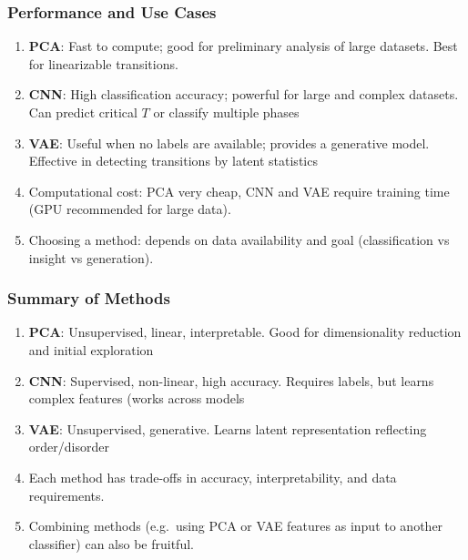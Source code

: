 \documentclass{beamer}
\begin{document}
\begin{frame}
\frametitle{Performance and Use Cases}

\begin{enumerate}
\item \textbf{PCA}: Fast to compute; good for preliminary analysis of large datasets. Best for linearizable transitions.

\item \textbf{CNN}: High classification accuracy; powerful for large and complex datasets. Can predict critical $T$ or classify multiple phases 

\item \textbf{VAE}: Useful when no labels are available; provides a generative model. Effective in detecting transitions by latent statistics 

\item Computational cost: PCA very cheap, CNN and VAE require training time (GPU recommended for large data).

\item Choosing a method: depends on data availability and goal (classification vs insight vs generation).
\end{enumerate}

\noindent
\end{frame}

\begin{frame}
\frametitle{Summary of Methods}

\begin{enumerate}
\item \textbf{PCA}: Unsupervised, linear, interpretable. Good for dimensionality reduction and initial exploration

\item \textbf{CNN}: Supervised, non-linear, high accuracy. Requires labels, but learns complex features (works across models 

\item \textbf{VAE}: Unsupervised, generative. Learns latent representation reflecting order/disorder 

\item Each method has trade-offs in accuracy, interpretability, and data requirements.

\item Combining methods (e.g.\ using PCA or VAE features as input to another classifier) can also be fruitful.
\end{enumerate}

\noindent
\end{frame}
\end{document}
